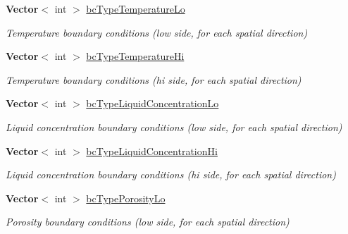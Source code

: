 \begin{DoxyCompactItemize}
\mbox{\label{class_mushy_layer_params_aa6d0b74290e73410c2fb7eda2bb2efa5}} 
\textbf{ Vector}$<$ int $>$ \hyperlink{class_mushy_layer_params_aa6d0b74290e73410c2fb7eda2bb2efa5}{bc\+Type\+Temperature\+Lo}
\begin{DoxyCompactList}\small\item\em Temperature boundary conditions (low side, for each spatial direction) \end{DoxyCompactList}\item 
\mbox{\label{class_mushy_layer_params_a8862878c5d545a228a100fb6ef527cc9}} 
\textbf{ Vector}$<$ int $>$ \hyperlink{class_mushy_layer_params_a8862878c5d545a228a100fb6ef527cc9}{bc\+Type\+Temperature\+Hi}
\begin{DoxyCompactList}\small\item\em Temperature boundary conditions (hi side, for each spatial direction) \end{DoxyCompactList}\item 
\mbox{\label{class_mushy_layer_params_a14ab801e982911620a5367a5a19091a2}} 
\textbf{ Vector}$<$ int $>$ \hyperlink{class_mushy_layer_params_a14ab801e982911620a5367a5a19091a2}{bc\+Type\+Liquid\+Concentration\+Lo}
\begin{DoxyCompactList}\small\item\em Liquid concentration boundary conditions (low side, for each spatial direction) \end{DoxyCompactList}\item 
\mbox{\label{class_mushy_layer_params_a7ef4f85d8b31359cb3a4bab15333a885}} 
\textbf{ Vector}$<$ int $>$ \hyperlink{class_mushy_layer_params_a7ef4f85d8b31359cb3a4bab15333a885}{bc\+Type\+Liquid\+Concentration\+Hi}
\begin{DoxyCompactList}\small\item\em Liquid concentration boundary conditions (hi side, for each spatial direction) \end{DoxyCompactList}\item 
\mbox{\label{class_mushy_layer_params_a32e3ba5dee5c413aabdbd237b10665c6}} 
\textbf{ Vector}$<$ int $>$ \hyperlink{class_mushy_layer_params_a32e3ba5dee5c413aabdbd237b10665c6}{bc\+Type\+Porosity\+Lo}
\begin{DoxyCompactList}\small\item\em Porosity boundary conditions (low side, for each spatial direction) \end{DoxyCompactList}\item 

\end{DoxyCompactItemize}
